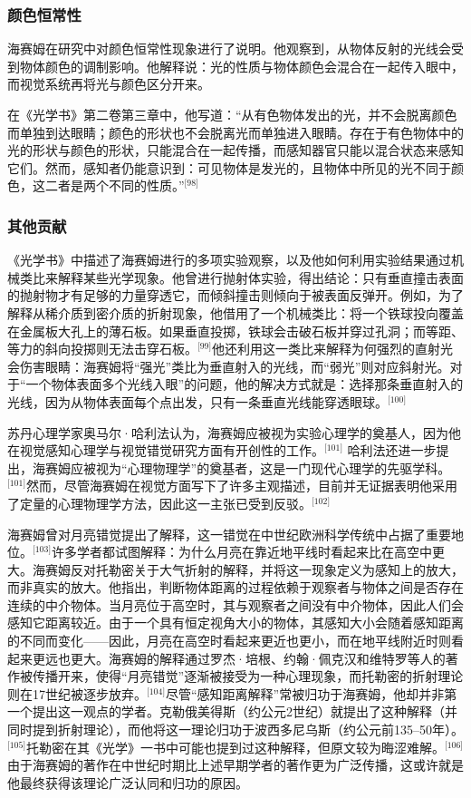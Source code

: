 \subsubsection{颜色恒常性}
海赛姆在研究中对颜色恒常性现象进行了说明。他观察到，从物体反射的光线会受到物体颜色的调制影响。他解释说：光的性质与物体颜色会混合在一起传入眼中，而视觉系统再将光与颜色区分开来。

在《光学书》第二卷第三章中，他写道：“从有色物体发出的光，并不会脱离颜色而单独到达眼睛；颜色的形状也不会脱离光而单独进入眼睛。存在于有色物体中的光的形状与颜色的形状，只能混合在一起传播，而感知器官只能以混合状态来感知它们。然而，感知者仍能意识到：可见物体是发光的，且物体中所见的光不同于颜色，这二者是两个不同的性质。”\(^\text{[98]}\)
\subsubsection{其他贡献}
《光学书》中描述了海赛姆进行的多项实验观察，以及他如何利用实验结果通过机械类比来解释某些光学现象。他曾进行抛射体实验，得出结论：只有垂直撞击表面的抛射物才有足够的力量穿透它，而倾斜撞击则倾向于被表面反弹开。例如，为了解释从稀介质到密介质的折射现象，他借用了一个机械类比：将一个铁球投向覆盖在金属板大孔上的薄石板。如果垂直投掷，铁球会击破石板并穿过孔洞；而等距、等力的斜向投掷则无法击穿石板。\(^\text{[99]}\)他还利用这一类比来解释为何强烈的直射光会伤害眼睛：海赛姆将“强光”类比为垂直射入的光线，而“弱光”则对应斜射光。对于“一个物体表面多个光线入眼”的问题，他的解决方式就是：选择那条垂直射入的光线，因为从物体表面每个点出发，只有一条垂直光线能穿透眼球。\(^\text{[100]}\)

苏丹心理学家奥马尔·哈利法认为，海赛姆应被视为实验心理学的奠基人，因为他在视觉感知心理学与视觉错觉研究方面有开创性的工作。\(^\text{[101]}\)
哈利法还进一步提出，海赛姆应被视为“心理物理学”的奠基者，这是一门现代心理学的先驱学科。\(^\text{[101]}\)然而，尽管海赛姆在视觉方面写下了许多主观描述，目前并无证据表明他采用了定量的心理物理学方法，因此这一主张已受到反驳。\(^\text{[102]}\)

海赛姆曾对月亮错觉提出了解释，这一错觉在中世纪欧洲科学传统中占据了重要地位。\(^\text{[103]}\)许多学者都试图解释：为什么月亮在靠近地平线时看起来比在高空中更大。海赛姆反对托勒密关于大气折射的解释，并将这一现象定义为感知上的放大，而非真实的放大。他指出，判断物体距离的过程依赖于观察者与物体之间是否存在连续的中介物体。当月亮位于高空时，其与观察者之间没有中介物体，因此人们会感知它距离较近。由于一个具有恒定视角大小的物体，其感知大小会随着感知距离的不同而变化——因此，月亮在高空时看起来更近也更小，而在地平线附近时则看起来更远也更大。海赛姆的解释通过罗杰·培根、约翰·佩克汉和维特罗等人的著作被传播开来，使得“月亮错觉”逐渐被接受为一种心理现象，而托勒密的折射理论则在17世纪被逐步放弃。\(^\text{[104]}\)尽管“感知距离解释”常被归功于海赛姆，他却并非第一个提出这一观点的学者。克勒俄美得斯（约公元2世纪）就提出了这种解释（并同时提到折射理论），而他将这一理论归功于波西多尼乌斯（约公元前135–50年）。\(^\text{[105]}\)托勒密在其《光学》一书中可能也提到过这种解释，但原文较为晦涩难解。\(^\text{[106]}\)由于海赛姆的著作在中世纪时期比上述早期学者的著作更为广泛传播，这或许就是他最终获得该理论广泛认同和归功的原因。
